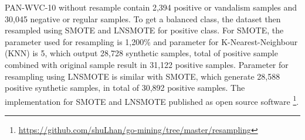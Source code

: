 PAN-WVC-10 without resample contain 2,394 positive or vandalism samples and
30,045 negative or regular samples.
To get a balanced class, the dataset then resampled using SMOTE and LNSMOTE for
positive class.
For SMOTE, the parameter used for resampling is 1,200\% and parameter for
K-Nearest-Neighbour (KNN) is 5, which output 28,728 synthetic samples, total of
positive sample combined with original sample result in 31,122 positive
samples.
Parameter for resampling using LNSMOTE is similar with SMOTE, which generate
28,588 positive synthetic samples, in total of 30,892 positive samples.
The implementation for SMOTE and LNSMOTE published as open source software
\footnote{\url{https://github.com/shuLhan/go-mining/tree/master/resampling}}.
